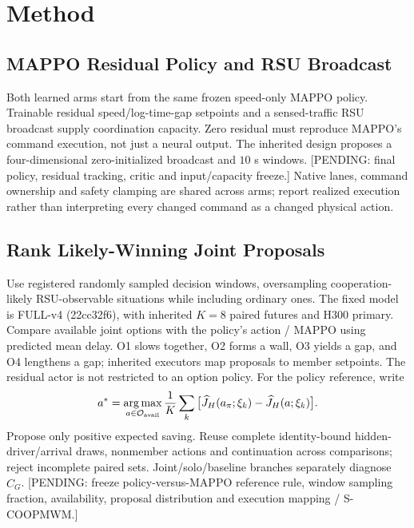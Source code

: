 \documentclass[conference]{IEEEtran}
\newcommand{\pending}[1]{\textcolor{red!80!black}{[PENDING: #1]}}
\begin{document}
\section{Method}
\subsection{MAPPO Residual Policy and RSU Broadcast}
Both learned arms start from the same frozen speed-only MAPPO policy.
Trainable residual speed/log-time-gap setpoints and a sensed-traffic RSU
broadcast supply coordination capacity. Zero residual must reproduce MAPPO's
command execution, not just a neural output. The inherited design proposes
a four-dimensional zero-initialized broadcast and $10$ s windows.
\pending{final policy, residual tracking, critic and input/capacity freeze.}
Native lanes, command ownership and safety clamping are shared across arms;
report realized execution rather than interpreting every changed command as
a changed physical action.

\subsection{Rank Likely-Winning Joint Proposals}
Use registered randomly sampled decision windows, oversampling cooperation-likely
RSU-observable situations while including ordinary ones. The fixed model is
FULL-v4 (22cc32f6), with inherited $K=8$ paired futures and H300 primary.
Compare available joint options with the policy's action / MAPPO using
predicted mean delay. O1 slows together, O2 forms a wall, O3 yields a gap,
and O4 lengthens a gap; inherited executors map proposals to member setpoints.
The residual actor is not restricted to an option policy. For the policy
reference, write
\begin{equation}
 a^*=\mathop{\arg\max}_{a\in\mathcal O_{\rm avail}}
 \frac1K\sum_k\big[\widehat J_H(a_\pi;\xi_k)-\widehat J_H(a;\xi_k)\big].
\end{equation}
Propose only positive expected saving. Reuse complete identity-bound
hidden-driver/arrival draws, nonmember actions and continuation across
comparisons; reject incomplete paired sets. Joint/solo/baseline branches
separately diagnose $\widehat C_G$.
\pending{freeze policy-versus-MAPPO reference rule, window sampling fraction,
availability, proposal distribution and execution mapping / S-COOPMWM.}
\end{document}
